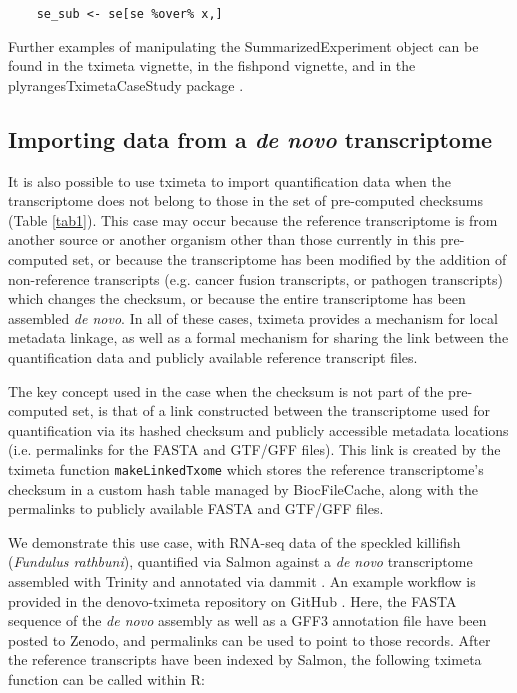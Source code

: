 \documentclass[12pt]{article}
\begin{document}
\begin{verbatim}
    se_sub <- se[se %over% x,]
\end{verbatim}

Further examples of manipulating the SummarizedExperiment object can be found in the tximeta vignette, in the fishpond vignette, and in the plyrangesTximetaCaseStudy package \citep{casestudy}.

\subsection*{Importing data from a \textit{de novo} transcriptome}

It is also possible to use tximeta to import quantification data when the transcriptome does not belong to those in the set of pre-computed checksums (Table \ref{tab1}). This case may occur because the reference transcriptome is from another source or another organism other than those currently in this pre-computed set, or because the transcriptome has been modified by the addition of non-reference transcripts (e.g. cancer fusion transcripts, or pathogen transcripts) which changes the checksum, or because the entire transcriptome has been assembled \textit{de novo}. In all of these cases, tximeta provides a mechanism for local metadata linkage, as well as a formal mechanism for sharing the link between the quantification data and publicly available reference transcript files.

The key concept used in the case when the checksum is not part of the pre-computed set, is that of a link constructed between the transcriptome used for quantification via its hashed checksum and publicly accessible metadata locations (i.e. permalinks for the FASTA and GTF/GFF files). This link is created by the tximeta function \texttt{makeLinkedTxome} which stores the reference transcriptome's checksum in a custom hash table managed by BiocFileCache, along with the permalinks to publicly available FASTA and GTF/GFF files. 

We demonstrate this use case, with RNA-seq data of the speckled killifish (\textit{Fundulus rathbuni}), quantified via Salmon \citep{salmon} against a \textit{de novo} transcriptome assembled with Trinity \citep{trinity} and annotated via dammit \citep{dammit}. An example workflow is provided in the denovo-tximeta repository on GitHub \citep{denovo}. Here, the FASTA sequence of the \textit{de novo} assembly as well as a GFF3 annotation file have been posted to Zenodo, and permalinks can be used to point to those records. After the reference transcripts have been indexed by Salmon, the following tximeta function can be called within R:
\end{document}
